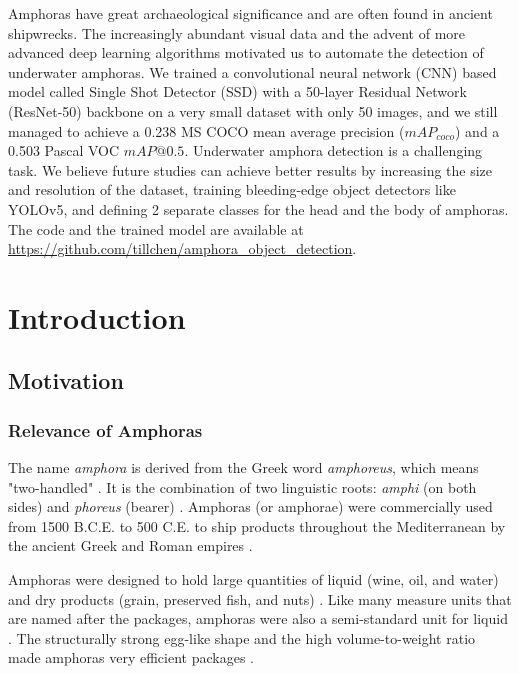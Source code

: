 \documentclass[a4paper, 11pt, oneside]{article}
\begin{document}
Amphoras have great archaeological significance and are often found in ancient shipwrecks. The increasingly abundant
visual data and the advent of more advanced deep learning algorithms motivated us to automate the detection of
underwater amphoras. We trained a convolutional neural network (CNN) based model called Single Shot Detector (SSD) with
a 50-layer Residual Network (ResNet-50) backbone on a very small dataset with only 50 images, and we still managed to
achieve a 0.238 MS COCO mean average precision ($mAP_{coco}$) and a 0.503 Pascal VOC $mAP@0.5$. Underwater amphora
detection is a challenging task. We believe future studies can achieve better results by increasing the size and
resolution of the dataset, training bleeding-edge object detectors like YOLOv5, and defining 2 separate classes for
the head and the body of amphoras. The code and the trained model are available at
\url{https://github.com/tillchen/amphora_object_detection}.

\newpage

\tableofcontents

\clearpage
{}

\section{Introduction}

\subsection{Motivation}

\subsubsection{Relevance of Amphoras}

The name \textit{amphora} is derived from the Greek word \textit{amphoreus}, which means "two-handled"
\cite{harper2001online, twede2002commercial, will1977ancient}. It is the combination of two linguistic roots:
\textit{amphi} (on both sides) and \textit{phoreus} (bearer)
\cite{harper2001online, twede2002commercial, will1977ancient}. Amphoras (or amphorae) were commercially used from
1500 B.C.E. to 500 C.E. to ship products throughout the Mediterranean by the ancient Greek and Roman empires
\cite{twede2002commercial, worldhistory}.

Amphoras were designed to hold large quantities of liquid (wine, oil, and water) and dry products
(grain, preserved fish, and nuts) \cite{twede2002commercial, foley2012aspects, grace1979amphoras}. Like many measure
units that are named after the packages, amphoras were also a semi-standard unit for liquid \cite{twede2002commercial}.
The structurally strong egg-like shape and the high volume-to-weight ratio made amphoras very efficient packages
\cite{twede2002commercial, worldhistory}.
\end{document}
